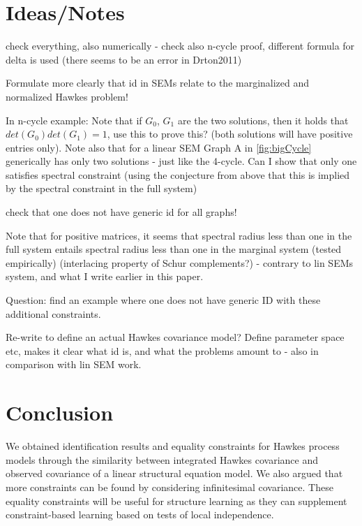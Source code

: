 \documentclass[accepted]{uai2021} %
\begin{document}

\section{Ideas/Notes}

check everything, also numerically - check also n-cycle proof, different 
formula for delta is used (there seems to be an error in Drton2011)

Formulate more clearly that id in SEMs relate to the marginalized and 
normalized Hawkes problem!

In n-cycle example: Note that if $G_0$, $G_1$ are the 
two solutions, then it holds that $det(G_0)det(G_1) = 1$, use this to prove 
this? (both solutions will have positive entries only). Note also that for a 
linear SEM Graph A in \ref{fig:bigCycle} generically has only two solutions - 
just like the 4-cycle. Can I show that only one satisfies spectral constraint 
(using the conjecture from above that this is implied by the spectral 
constraint in the full system)

check that one does not have generic id for all graphs!

Note that for positive matrices, it seems that spectral radius less than one in 
the full system entails spectral radius less than one in the marginal system 
(tested empirically) (interlacing property of Schur complements?) - contrary to 
lin SEMs system, and what I write earlier in this paper.



Question: find an example where one does not have generic ID with these 
additional constraints.

Re-write to define an actual Hawkes covariance model? Define parameter space 
etc, makes it clear what id is, and what the problems amount to - also in 
comparison with lin SEM work.

\section{Conclusion}

We obtained identification results and equality constraints for Hawkes process 
models through the similarity between integrated Hawkes covariance and observed 
covariance of a linear structural equation model. We also argued that more 
constraints can be found by considering infinitesimal covariance. These 
equality constraints will be useful for structure learning as they can 
supplement constraint-based learning based on tests of local independence.
\end{document}
